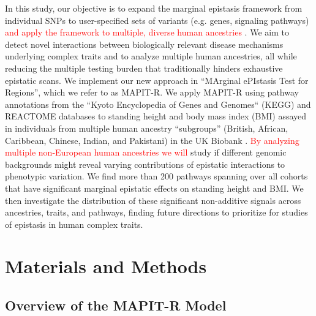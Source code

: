 \documentclass[10pt]{article}
\begin{document}
In this study, our objective is to expand the marginal epistasis framework from individual SNPs to user-specified sets of variants (e.g. genes, signaling pathways) \textcolor{red}{and apply the framework to multiple, diverse human ancestries} . We aim to detect novel interactions between biologically relevant disease mechanisms underlying complex traits and to analyze multiple human ancestries, all while reducing the multiple testing burden that traditionally hinders exhaustive epistatic scans. We implement our new approach in ``MArginal ePIstasis Test for Regions'', which we refer to as MAPIT-R. We apply MAPIT-R using pathway annotations from the ``Kyoto Encyclopedia of Genes and Genomes`` (KEGG) and REACTOME databases \cite{Liberzon2011} to standing height and body mass index (BMI) assayed in individuals from multiple human ancestry ``subgroups'' (British, African, Caribbean, Chinese, Indian, and Pakistani) in the UK Biobank \cite{Sudlow2015}. \textcolor{red}{By analyzing multiple non-European human ancestries we will} study if different genomic backgrounds might reveal varying contributions of epistatic interactions to phenotypic variation. We find more than 200 pathways spanning over all cohorts that have significant marginal epistatic effects on standing height and BMI. We then investigate the distribution of these significant non-additive signals across ancestries, traits, and pathways, finding future directions to prioritize for studies of epistasis in human complex traits.


\section*{Materials and Methods} 

\subsection*{Overview of the MAPIT-R Model}
\end{document}

